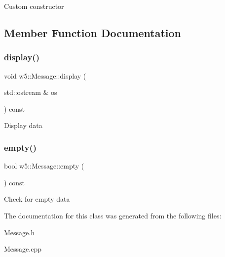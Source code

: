 Custom constructor 

\subsection{Member Function Documentation}
\mbox{\label{classw5_1_1_message_a62557fb75ec980a11f6dd3910f52143a}} 
\subsubsection{\texorpdfstring{display()}{display()}}
{\footnotesize\ttfamily void w5\+::\+Message\+::display (\begin{DoxyParamCaption}\item[{std\+::ostream \&}]{os }\end{DoxyParamCaption}) const}

Display data \mbox{\label{classw5_1_1_message_aeeb54ee5ef1fd404dfbf0c7ff3f1cbf7}} 
\subsubsection{\texorpdfstring{empty()}{empty()}}
{\footnotesize\ttfamily bool w5\+::\+Message\+::empty (\begin{DoxyParamCaption}{ }\end{DoxyParamCaption}) const}

Check for empty data 

The documentation for this class was generated from the following files\+:\begin{DoxyCompactItemize}
\item 
\mbox{\hyperlink{_message_8h}{Message.\+h}}\item 
Message.\+cpp\end{DoxyCompactItemize}
